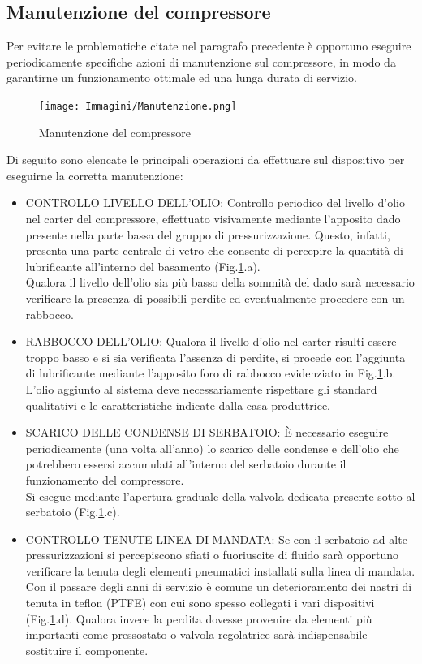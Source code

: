 \subsection{Manutenzione del compressore}
Per evitare le problematiche citate nel paragrafo precedente è opportuno eseguire periodicamente specifiche azioni di manutenzione sul compressore, in modo da garantirne un funzionamento ottimale ed una lunga durata di servizio. \begin{figure}[h]
    \centering
    \texttt{[image: Immagini/Manutenzione.png]}
    \caption{Manutenzione del compressore}
    \label{fig:Manutenzione}
\end{figure}

Di seguito sono elencate le principali operazioni da effettuare sul dispositivo per eseguirne la corretta manutenzione:
\begin{itemize}
    \item CONTROLLO LIVELLO DELL’OLIO: Controllo periodico del livello d’olio nel carter del compressore, effettuato visivamente mediante l’apposito dado presente nella parte bassa del gruppo di pressurizzazione. Questo, infatti, presenta una parte centrale di vetro che consente di percepire la quantità di lubrificante all’interno del basamento (Fig.\ref{fig:Manutenzione}.a). \\
    Qualora il livello dell’olio sia più basso della sommità del dado sarà necessario verificare la presenza di possibili perdite ed eventualmente procedere con un rabbocco.
    \item RABBOCCO DELL’OLIO: Qualora il livello d’olio nel carter risulti essere troppo basso e si sia verificata l’assenza di perdite, si procede con l’aggiunta di lubrificante mediante l’apposito foro di rabbocco evidenziato in Fig.\ref{fig:Manutenzione}.b. L’olio aggiunto al sistema deve necessariamente rispettare gli standard qualitativi e le caratteristiche indicate dalla casa produttrice. 
    \item SCARICO DELLE CONDENSE DI SERBATOIO: È necessario eseguire periodicamente (una volta all’anno) lo scarico delle condense e dell’olio che potrebbero essersi accumulati all’interno del serbatoio durante il funzionamento del compressore.\\
    Si esegue mediante l’apertura graduale della valvola dedicata presente sotto al serbatoio (Fig.\ref{fig:Manutenzione}.c).
    \item CONTROLLO TENUTE LINEA DI MANDATA: Se con il serbatoio ad alte pressurizzazioni si percepiscono sfiati o fuoriuscite di fluido sarà opportuno verificare la tenuta degli elementi pneumatici installati sulla linea di mandata. \\
    Con il passare degli anni di servizio è comune un deterioramento dei nastri di tenuta in teflon (PTFE) con cui sono spesso collegati i vari dispositivi (Fig.\ref{fig:Manutenzione}.d). Qualora invece la perdita dovesse provenire da elementi più importanti come pressostato o valvola regolatrice sarà indispensabile sostituire il componente.
\end{itemize}
